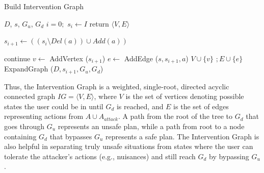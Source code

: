 \documentclass[letterpaper]{article}
\theoremstyle{plain}
\begin{document}
\begin{algorithm}[tb]
        \caption{Build Intervention Graph}
        \label{bsg}
        \begin{algorithmic}[1]
                \Require $D$, $s$, $G_u$, $G_d$
                \State $i=0;$ $ s_{i} \gets I $
                 return $\langle V,E\rangle$
                \Else
                                \State \parbox[t]{0.95\linewidth} 
                                {$s_{i+1} \gets ((s_{i} \setminus Del(a))\cup Add(a))$}
                                 continue \EndIf
                                \State $v \gets$ AddVertex ($s_{i+1}$)
                                \State $e \gets$ AddEdge ($s, s_{i+1}, a$)
                                \State $V \cup \{v\}$ $; E \cup \{e\}$
                                \State ExpandGraph ($D, s_{i+1}, G_u, G_d$)
                        \EndFor
                \EndIf  
                \EndProcedure
        \end{algorithmic}
\end{algorithm}

Thus, the Intervention Graph is a weighted, single-root, directed acyclic connected graph $IG= \langle V,E \rangle$, where $V$ is the set of vertices denoting possible states the user could be in until $G_d$ is reached, and $E$ is the set of edges representing actions from $A \cup A_{attack}$. A path from the root of the tree to $G_d$ that goes through $G_u$ represents an unsafe plan, while a path from root to a node containing $G_d$ that bypasses $G_u$ represents a safe plan. The Intervention Graph is also helpful in separating truly unsafe situations from states where the user can tolerate the attacker's actions (e.g., nuisances) and still reach $G_d$ by bypassing $G_u$. 
\end{document}

